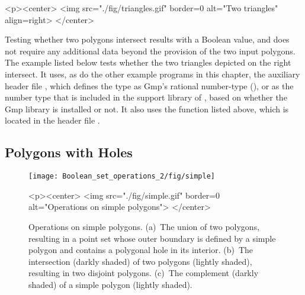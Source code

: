 \lcTex{%
  \setlength{\BooleanSetOpsWidthRight}{1.4cm}
  \setlength{\BooleanSetOpsWidthLeft}{\BooleanSetOpsWidthLineReal}
  \addtolength{\BooleanSetOpsWidthLeft}{-\BooleanSetOpsWidthRight}
  \begin{minipage}{\BooleanSetOpsWidthLeft}
}
\label{fig:example}
\begin{ccHtmlOnly}
  <p><center>
    <img src="./fig/triangles.gif" border=0 alt="Two triangles" align=right>
  </center>
\end{ccHtmlOnly}
Testing whether two polygons intersect results with a Boolean value, 
and does not require any additional data beyond the provision of the 
two input polygons. The example listed below tests whether the two
triangles depicted on the right intersect. It uses, as do the other
example programs in this chapter, the auxiliary header file
, which defines the type  as
{\sc Gmp}'s rational number-type (), or as the
number type  that is included in the support
library of \cgal, based on whether the {\sc Gmp} library is installed
or not. It also uses the function  listed above,
which is located in the header file .


\subsection{Polygons with Holes\label{bso_ssec:polygons_with_holes}}

\begin{figure}[!htp]
\begin{ccTexOnly}
  \begin{center}
  \texttt{[image: Boolean\_set\_operations\_2/fig/simple]}
  \end{center}
\end{ccTexOnly}
\label{fig:simple}
\begin{ccHtmlOnly}
  <p><center>
    <img src="./fig/simple.gif" border=0 alt="Operations on 
    simple polygons">
  </center>
\end{ccHtmlOnly}
\caption{Operations on simple polygons. (a)~The union of two
polygons, resulting in a point set whose outer boundary is defined by
a simple polygon and contains a polygonal hole in its interior. (b)~The
intersection (darkly shaded) of two polygons (lightly shaded), resulting
in two disjoint polygons. (c)~The complement (darkly shaded) of a
simple polygon (lightly shaded).} 
\end{figure}

